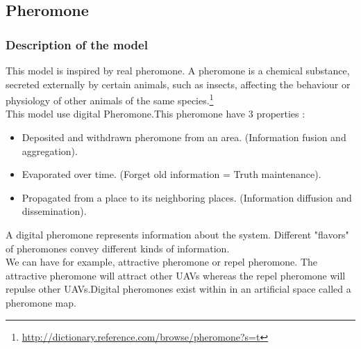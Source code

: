 \subsection{Pheromone}

\subsubsection{Description of the model}
This model is inspired by real pheromone. A pheromone is a chemical substance, secreted externally by certain animals, such as insects, affecting the behaviour or physiology of other animals of the same species.\footnote{\url{http://dictionary.reference.com/browse/pheromone?s=t}}
\\
This model use digital Pheromone.This pheromone have 3 properties :

\begin{itemize}
\item  Deposited and withdrawn pheromone from an area. (Information fusion and aggregation).
\item  Evaporated over time. (Forget old information = Truth maintenance).
\item  Propagated from a place to its neighboring places. (Information diffusion and dissemination). 
\end{itemize}

A  digital  pheromone  represents  information  about  the  system. Different  "flavors"  of  pheromones convey different kinds of information.\\ We can have for example, attractive pheromone or repel pheromone. The attractive pheromone will attract other UAVs whereas the repel pheromone will repulse other UAVs.Digital pheromones exist within in an artificial space called a pheromone map.

